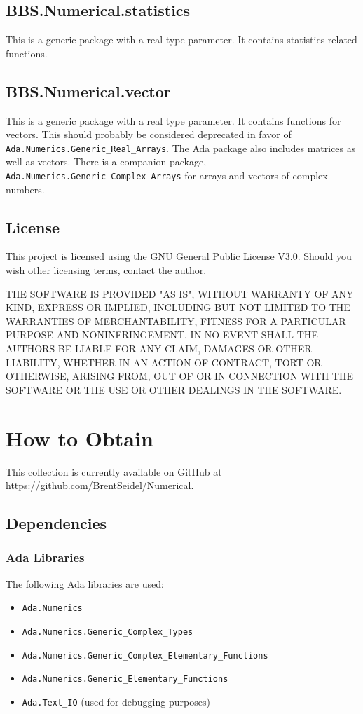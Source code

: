 \documentclass[10pt, openany]{book}
\newcommand{\package}[1]{\texttt{#1}}
\begin{document}
\section{BBS.Numerical.statistics}
This is a generic package with a real type parameter.  It contains statistics related functions.

\section{BBS.Numerical.vector}
This is a generic package with a real type parameter.  It contains functions for vectors.  This should probably be considered deprecated in favor of \package{Ada.Numerics.Generic\_Real\_Arrays}.  The Ada package also includes matrices as well as vectors.  There is a companion package, \package{Ada.Numerics.Generic\_Complex\_Arrays} for arrays and vectors of complex numbers.

\section{License}
This project is licensed using the GNU General Public License V3.0.  Should you wish other licensing terms, contact the author.

THE SOFTWARE IS PROVIDED "AS IS", WITHOUT WARRANTY OF ANY KIND, EXPRESS OR IMPLIED, INCLUDING BUT NOT LIMITED TO THE WARRANTIES OF MERCHANTABILITY, FITNESS FOR A PARTICULAR PURPOSE AND NONINFRINGEMENT. IN NO EVENT SHALL THE AUTHORS BE LIABLE FOR ANY CLAIM, DAMAGES OR OTHER LIABILITY, WHETHER IN AN ACTION OF CONTRACT, TORT OR OTHERWISE, ARISING FROM, OUT OF OR IN CONNECTION WITH THE SOFTWARE OR THE USE OR OTHER DEALINGS IN THE SOFTWARE.

\chapter{How to Obtain}

This collection is currently available on GitHub at \url{https://github.com/BrentSeidel/Numerical}.

\section{Dependencies}
\subsection{Ada Libraries}
The following Ada libraries are used:
\begin{itemize}
  \item \package{Ada.Numerics}
  \item \package{Ada.Numerics.Generic\_Complex\_Types}
  \item \package{Ada.Numerics.Generic\_Complex\_Elementary\_Functions}
  \item \package{Ada.Numerics.Generic\_Elementary\_Functions}
  \item \package{Ada.Text\_IO} (used for debugging purposes)
\end{itemize}
\end{document}
